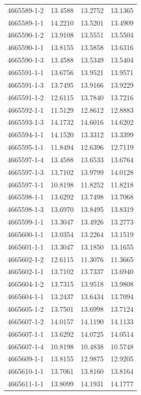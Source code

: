\begin{longtable}{lrrr}
4665589-1-2 & 13.4588 & 13.2752 & 13.1365 \\
4665589-1-1 & 14.2210 & 13.5201 & 13.4909 \\
4665590-1-2 & 13.9108 & 13.5551 & 13.5504 \\
4665590-1-1 & 13.8155 & 13.5858 & 13.6316 \\
4665590-1-3 & 13.4588 & 13.5349 & 13.5404 \\
4665591-1-1 & 13.6756 & 13.9521 & 13.9571 \\
4665591-1-3 & 13.7495 & 13.9166 & 13.9229 \\
4665591-1-2 & 12.6115 & 13.7840 & 13.7216 \\
4665592-1-1 & 11.5129 & 12.8612 & 12.8883 \\
4665593-1-3 & 14.1732 & 14.6016 & 14.6202 \\
4665594-1-1 & 14.1520 & 13.3312 & 13.3399 \\
4665595-1-1 & 11.8494 & 12.6396 & 12.7119 \\
4665597-1-4 & 13.4588 & 13.6533 & 13.6764 \\
4665597-1-3 & 13.7102 & 13.9799 & 14.0128 \\
4665597-1-1 & 10.8198 & 11.8252 & 11.8218 \\
4665598-1-1 & 13.6292 & 13.7498 & 13.7068 \\
4665598-1-3 & 13.6970 & 13.8495 & 13.8319 \\
4665599-1-1 & 13.3047 & 13.4926 & 13.2773 \\
4665600-1-1 & 13.0354 & 13.2264 & 13.1519 \\
4665601-1-1 & 13.3047 & 13.1850 & 13.1655 \\
4665602-1-2 & 12.6115 & 11.3076 & 11.3665 \\
4665602-1-1 & 13.7102 & 13.7337 & 13.6940 \\
4665604-1-2 & 13.7315 & 13.9518 & 13.9808 \\
4665604-1-1 & 13.2437 & 13.6434 & 13.7094 \\
4665605-1-2 & 13.7501 & 13.6998 & 13.7124 \\
4665607-1-2 & 14.0157 & 14.1190 & 14.1133 \\
4665607-1-1 & 13.6292 & 14.0725 & 14.0514 \\
4665607-1-4 & 10.8198 & 10.4838 & 10.5748 \\
4665609-1-1 & 13.8155 & 12.9875 & 12.9205 \\
4665610-1-1 & 13.7061 & 13.8160 & 13.8164 \\
4665611-1-1 & 13.8099 & 14.1931 & 14.1777 \\

\end{longtable}
